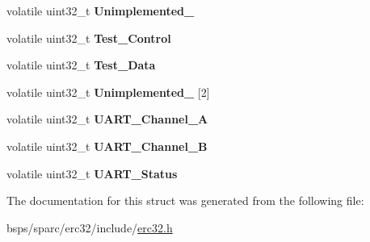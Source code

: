 \begin{DoxyCompactItemize}
volatile uint32\+\_\+t {\bfseries Unimplemented\+\_}
\item 
\mbox{\label{structERC32__Register__Map_aea4597665d980f946a5bb4bb5e49e987}} 
volatile uint32\+\_\+t {\bfseries Test\+\_\+\+Control}
\item 
\mbox{\label{structERC32__Register__Map_a99275e6f0af8618940f0821aa79ec98d}} 
volatile uint32\+\_\+t {\bfseries Test\+\_\+\+Data}
\item 
\mbox{\label{structERC32__Register__Map_a70042aec166af9b04f52ee968d58fd86}} 
volatile uint32\+\_\+t {\bfseries Unimplemented\+\_} \mbox{[}2\mbox{]}
\item 
\mbox{\label{structERC32__Register__Map_a8c7f063f905e524413ce37afaacf15ac}} 
volatile uint32\+\_\+t {\bfseries U\+A\+R\+T\+\_\+\+Channel\+\_\+A}
\item 
\mbox{\label{structERC32__Register__Map_a8516310d0340de580f5de22d4e53d109}} 
volatile uint32\+\_\+t {\bfseries U\+A\+R\+T\+\_\+\+Channel\+\_\+B}
\item 
\mbox{\label{structERC32__Register__Map_ae25a5a99564fd922cc127cf878362c4b}} 
volatile uint32\+\_\+t {\bfseries U\+A\+R\+T\+\_\+\+Status}
\end{DoxyCompactItemize}


The documentation for this struct was generated from the following file\+:\begin{DoxyCompactItemize}
\item 
bsps/sparc/erc32/include/\mbox{\hyperlink{erc32_8h}{erc32.\+h}}\end{DoxyCompactItemize}
